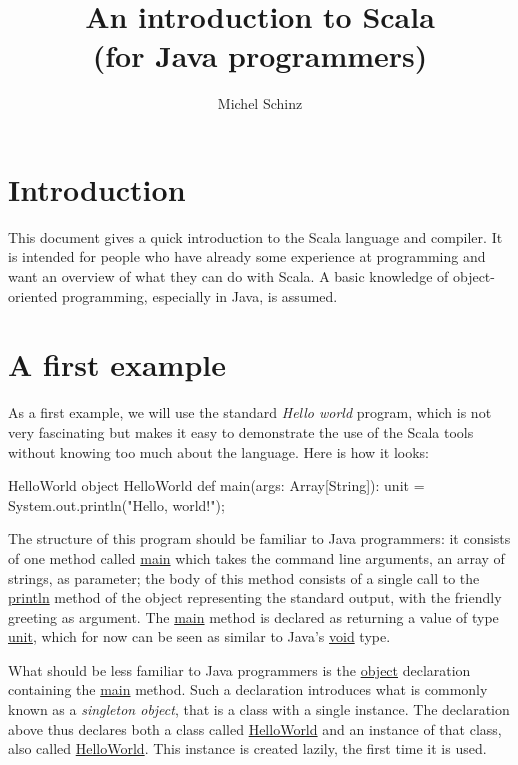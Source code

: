 \documentclass[a4paper,12pt]{article}
\newcommand{\langname}[1]{#1\xspace}
\newcommand{\Scala}{\langname{Scala}}
\newcommand{\Java}{\langname{Java}}
\newcommand{\ident}[1]{\url{#1}\xspace}
\begin{document}
\title{An introduction to \Scala\\[.5em]\normalsize(for \Java programmers)}
\author{Michel Schinz}
\maketitle

\section{Introduction}
\label{sec:introduction}

This document gives a quick introduction to the \Scala language and
compiler. It is intended for people who have already some experience
at programming and want an overview of what they can do with \Scala. A
basic knowledge of object-oriented programming, especially in \Java,
is assumed.

\section{A first example}
\label{sec:first-example}

As a first example, we will use the standard \emph{Hello world}
program, which is not very fascinating but makes it easy to
demonstrate the use of the \Scala tools without knowing too much about
the language. Here is how it looks:
\begin{scalaprogram}{HelloWorld}
object HelloWorld {
  def main(args: Array[String]): unit = {
    System.out.println("Hello, world!");
  }
}
\end{scalaprogram}

The structure of this program should be familiar to Java programmers:
it consists of one method called \ident{main} which takes the command
line arguments, an array of strings, as parameter; the body of this
method consists of a single call to the \ident{println} method of the
object representing the standard output, with the friendly greeting as
argument. The \ident{main} method is declared as returning a value of
type \ident{unit}, which for now can be seen as similar to \Java's
\ident{void} type.

What should be less familiar to Java programmers is the \ident{object}
declaration containing the \ident{main} method. Such a declaration
introduces what is commonly known as a \emph{singleton object}, that
is a class with a single instance. The declaration above thus declares
both a class called \ident{HelloWorld} and an instance of that class,
also called \ident{HelloWorld}. This instance is created lazily, the
first time it is used.
\end{document}
